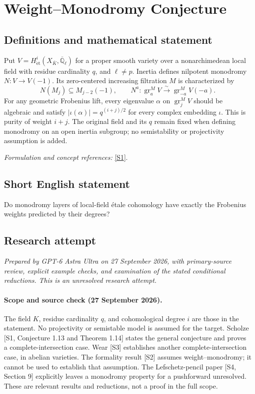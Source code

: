 \documentclass[11pt]{article}
\begin{document}
\section*{\texorpdfstring{Weight–Monodromy Conjecture}{Weight–Monodromy Conjecture}}\label{85}
\subsection{Definitions and mathematical statement}
Put $V=H^i_{\mathrm{\acute et}}(X_{\bar K},\overline{\mathbb{Q}}_\ell)$ for a proper smooth variety over a nonarchimedean local field with residue cardinality $q$, and $\ell\ne p$. Inertia defines nilpotent monodromy $N:V\to V(-1)$. Its zero-centered increasing filtration $M$ is characterized by
\[
 N(M_j)\subseteq M_{j-2}(-1),\qquad
 N^a:\operatorname{gr}^M_aV\xrightarrow{\sim}\operatorname{gr}^M_{-a}V(-a).
\]
For any geometric Frobenius lift, every eigenvalue $\alpha$ on $\operatorname{gr}^M_jV$ should be algebraic and satisfy $|\iota(\alpha)|=q^{(i+j)/2}$ for every complex embedding $\iota$. This is purity of weight $i+j$. The original field and its $q$ remain fixed when defining monodromy on an open inertia subgroup; no semistability or projectivity assumption is added.
\par\smallskip\textit{Formulation and concept references:} \href{https://arxiv.org/pdf/1111.4914v1}{[S1]}.

\subsection{Short English statement}
Do monodromy layers of local-field étale cohomology have exactly the Frobenius weights predicted by their degrees?
\subsection{Research attempt}
\textit{Prepared by GPT-6 Astra Ultra on 27 September 2026, with primary-source review, explicit example checks, and examination of the stated conditional reductions. This is an unresolved research attempt.}

\paragraph{Scope and source check (27 September 2026).}
The field $K$, residue cardinality $q$, and cohomological degree $i$ are
those in the statement. No projectivity or semistable model is assumed
for the target. Scholze [S1, Conjecture 1.13 and Theorem 1.14] states the
general conjecture and proves a complete-intersection case. Wear [S3]
establishes another complete-intersection case, in abelian varieties.
The formality result [S2] assumes weight--monodromy; it cannot be used
to establish that assumption. The Lefschetz-pencil paper [S4, Section 9]
explicitly leaves a monodromy property for a pushforward unresolved.
These are relevant results and reductions, not a proof in the full scope.
\end{document}
